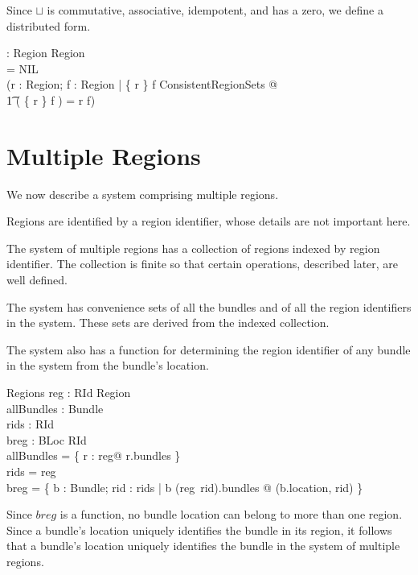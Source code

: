 \documentclass[a4paper,9pt]{article}
\begin{document}
Since $\sqcup$ is commutative, associative, idempotent, and has a zero, we define a distributed form.
\begin{axdef}
  \bigsqcup : \finset Region \pfun Region \\
\where
  \bigsqcup \emptyset = NIL \land \\
  (\forall r : Region; f : \finset Region | \{ r \} \cup f \in ConsistentRegionSets @ \\
\t1 \bigsqcup( \{ r \} \cup f ) = r \sqcup \bigsqcup f) \\ 
\end{axdef}
  
\clearpage
\section{Multiple Regions}
\label{cha:multiregions}

We now describe a system comprising multiple regions.

Regions are identified by a region identifier, whose details are not important here.
\begin{zed}
  [RId]
\end{zed}

The system of multiple regions has a collection of regions indexed by region identifier.
The collection is finite so that certain operations, described later, are well defined.
 
The system has convenience sets of all the bundles and of all the region identifiers in the system.
These sets are derived from the indexed collection.

The system also has a function for determining the region identifier of any bundle in the system from the
bundle's location.
\begin{schema}{Regions}
  reg : RId \ffun Region \\
  allBundles : \power Bundle \\
  rids : \power RId \\
  breg : BLoc \pfun RId \\
\where
 allBundles = \bigcup \{ r : \ran reg@ r.bundles \} \\
 rids = \dom reg \\
 breg = \{ b : Bundle; rid : rids | b \in (reg~rid).bundles @ (b.location, rid) \} \\
\end{schema}
Since $breg$ is a function, no bundle location can belong to more than one region.
Since a bundle's location uniquely identifies the bundle in its region, it follows that a bundle's location uniquely identifies the bundle in the system of multiple regions.
\end{document}
